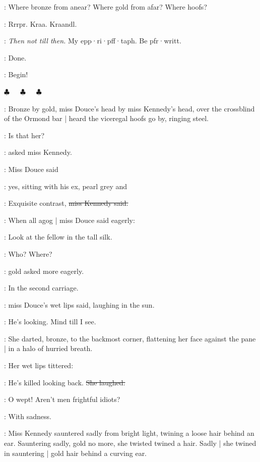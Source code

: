 \Bloom:
Where bronze from anear?
Where gold from afar?
Where hoofs?

:
Rrrpr.
Kraa.
Kraandl.

\emmet:
\emph{Then not till then.}
My epp·ri·pff·taph.
Be pfr·writt.

\Bloom:
Done.

\Bloom:
Begin!

\begin{center}
  $\clubsuit$~~~$\clubsuit$~~~$\clubsuit$
\end{center}

\pagebreak[2]


:
Bronze by gold,
miss Douce's head by miss Kennedy's head,
over the crossblind of the Ormond bar |
heard the viceregal hoofs go by,
ringing steel.

\MissK:
Is that her?

:
asked miss Kennedy.

:
Miss Douce said

\MissD:
yes,
sitting with his ex,
pearl grey and 

\MissK:
Exquisite contrast,
\sout{miss Kennedy said.}

:
When all agog |
miss Douce said eagerly:

\MissD:
Look at the fellow
in the tall silk.

\MissK:
Who?
Where?

:
gold asked more eagerly.

\MissD:
In the second carriage.

:
miss Douce's wet lips said,
laughing in the sun.

\MissD:
He's looking.
Mind till I see.

:
She darted,
bronze,
to the backmost corner,
flattening her face against the pane |
in a halo of hurried breath.

:
Her wet lips tittered:

\MissD:
He's killed looking back.
\stage{[laughs]}
\sout{She laughed:}

\MissD:
O wept!
Aren't men frightful idiots?

:
With sadness.

:
Miss Kennedy sauntered sadly from bright light,
twining a loose hair behind an ear.
Sauntering sadly,
gold no more,
she twisted twined a hair.
Sadly |
she twined in sauntering |
gold hair behind a curving ear.

